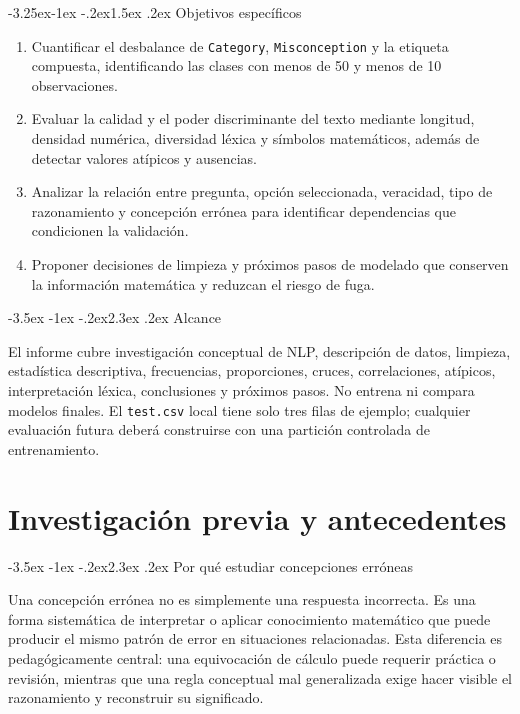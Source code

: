 \documentclass[11pt,oneside,openany]{book}
\makeatletter
\renewcommand\section{\@startsection{section}{1}{\z@}%
  {-3.5ex \@plus -1ex \@minus -.2ex}{2.3ex \@plus .2ex}%
  {\normalfont\Large\sffamily\bfseries\color{AzulMedio}}}
\renewcommand\subsection{\@startsection{subsection}{2}{\z@}%
  {-3.25ex\@plus -1ex \@minus -.2ex}{1.5ex \@plus .2ex}%
  {\normalfont\large\sffamily\bfseries\color{TurquesaOscuro}}}
\newcommand{\codigo}[1]{\texttt{#1}}
\makeatother
\begin{document}
\subsection{Objetivos específicos}

\begin{enumerate}
  \item Cuantificar el desbalance de \codigo{Category},
        \codigo{Misconception} y la etiqueta compuesta, identificando las clases
        con menos de 50 y menos de 10 observaciones.
  \item Evaluar la calidad y el poder discriminante del texto mediante longitud,
        densidad numérica, diversidad léxica y símbolos matemáticos, además de
        detectar valores atípicos y ausencias.
  \item Analizar la relación entre pregunta, opción seleccionada, veracidad,
        tipo de razonamiento y concepción errónea para identificar dependencias
        que condicionen la validación.
  \item Proponer decisiones de limpieza y próximos pasos de modelado que
        conserven la información matemática y reduzcan el riesgo de fuga.
\end{enumerate}

\section{Alcance}

El informe cubre investigación conceptual de NLP, descripción de datos,
limpieza, estadística descriptiva, frecuencias, proporciones, cruces,
correlaciones, atípicos, interpretación léxica, conclusiones y próximos pasos.
No entrena ni compara modelos finales. El \codigo{test.csv} local tiene solo
tres filas de ejemplo; cualquier evaluación futura deberá construirse con una
partición controlada de entrenamiento.

\chapter{Investigación previa y antecedentes}

\section{Por qué estudiar concepciones erróneas}

Una concepción errónea no es simplemente una respuesta incorrecta. Es una
forma sistemática de interpretar o aplicar conocimiento matemático que puede
producir el mismo patrón de error en situaciones relacionadas. Esta diferencia
es pedagógicamente central: una equivocación de cálculo puede requerir práctica
o revisión, mientras que una regla conceptual mal generalizada exige hacer
visible el razonamiento y reconstruir su significado.
\end{document}
